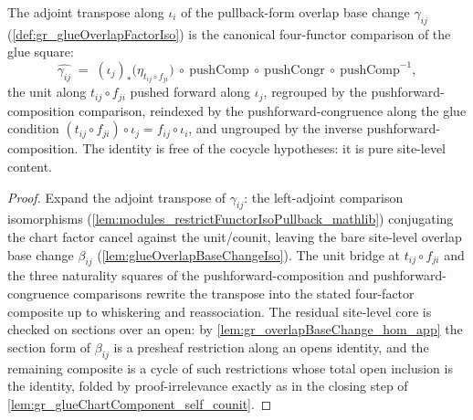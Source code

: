 \begin{lemma}\leanok
  \label{lem:gr_glueOverlapFactor_transpose}
  The adjoint transpose along \(\iota_i\) of the pullback-form overlap base change
  \(\gamma_{ij}\) (\cref{def:gr_glueOverlapFactorIso}) is the canonical four-functor
  comparison of the glue square:
  \[
    \widehat{\gamma_{ij}}
      \;=\;
    (\iota_j)_{*}\bigl(\eta_{t_{ij}\circ f_{ji}}\bigr)
      \ \circ\ \mathrm{pushComp}
      \ \circ\ \mathrm{pushCongr}
      \ \circ\ \mathrm{pushComp}^{-1},
  \]
  the unit along \(t_{ij}\circ f_{ji}\) pushed forward along \(\iota_j\), regrouped by
  the pushforward-composition comparison, reindexed by the pushforward-congruence along
  the glue condition \((t_{ij}\circ f_{ji})\circ \iota_j = f_{ij}\circ \iota_i\), and
  ungrouped by the inverse pushforward-composition. The identity is free of the
  cocycle hypotheses: it is pure site-level content.
\end{lemma}
\begin{proof}
    \leanok
  Expand the adjoint transpose of \(\gamma_{ij}\): the left-adjoint comparison
  isomorphisms (\cref{lem:modules_restrictFunctorIsoPullback_mathlib}) conjugating the
  chart factor cancel against the unit/counit, leaving the bare site-level overlap base
  change \(\beta_{ij}\) (\cref{lem:glueOverlapBaseChangeIso}). The unit bridge at
  \(t_{ij}\circ f_{ji}\) and the three naturality squares of the pushforward-composition
  and pushforward-congruence comparisons rewrite the transpose into the stated
  four-factor composite up to whiskering and reassociation. The residual site-level
  core is checked on sections over an open: by \cref{lem:gr_overlapBaseChange_hom_app}
  the section form of \(\beta_{ij}\) is a presheaf restriction along an opens identity,
  and the remaining composite is a cycle of such restrictions whose total open
  inclusion is the identity, folded by proof-irrelevance exactly as in the closing step
  of \cref{lem:gr_glueChartComponent_self_counit}.
\end{proof}

